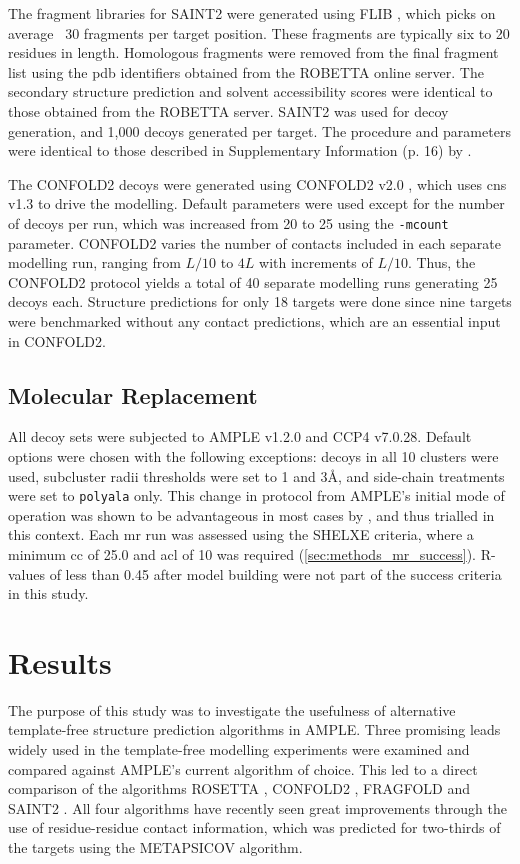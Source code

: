 The fragment libraries for SAINT2 were generated using FLIB \cite{De_Oliveira2015-kb}, which picks on average ~30 fragments per target position. These fragments are typically six to 20 residues in length. Homologous fragments were removed from the final fragment list using the \gls{pdb} identifiers obtained from the ROBETTA online server. The secondary structure prediction and solvent accessibility scores were identical to those obtained from the ROBETTA server. SAINT2 was used for decoy generation, and 1,000 decoys generated per target. The procedure and parameters were identical to those described in Supplementary Information (p. 16) by \textcite{De_Oliveira2018-sg}.

The CONFOLD2 decoys were generated using CONFOLD2 v2.0 \cite{Adhikari2018-lj}, which uses \gls{cns} v1.3 \cite{Brunger1998-sz} to drive the modelling. Default parameters were used except for the number of decoys per run, which was increased from 20 to 25 using the \texttt{-mcount} parameter. CONFOLD2 varies the number of contacts included in each separate modelling run, ranging from $L/10$ to $4L$ with increments of $L/10$. Thus, the CONFOLD2 protocol yields a total of 40 separate modelling runs generating 25 decoys each. Structure predictions for only 18 targets were done since nine targets were benchmarked without any contact predictions, which are an essential input in CONFOLD2.

\subsection{Molecular Replacement}
All decoy sets were subjected to AMPLE v1.2.0 and CCP4 v7.0.28. Default options were chosen with the following exceptions: decoys in all 10 clusters were used, subcluster radii thresholds were set to 1 and 3\AA, and side-chain treatments were set to \texttt{polyala} only. This change in protocol from AMPLE's initial mode of operation \cite{Bibby2012-lm} was shown to be advantageous in most cases by \textcite{Thomas2017-qu}, and thus trialled in this context.  Each \gls{mr} run was assessed using the SHELXE criteria, where a minimum \gls{cc} of 25.0 and \gls{acl} of 10 was required (\cref{sec:methods_mr_success}). R-values of less than 0.45 after model building were not part of the success criteria in this study.

\section{Results}
The purpose of this study was to investigate the usefulness of alternative template-free structure prediction algorithms in AMPLE. Three promising leads widely used in the template-free modelling experiments were examined and compared against AMPLE's current algorithm of choice. This led to a direct comparison of the algorithms ROSETTA \cite{Rohl2004-dj}, CONFOLD2 \cite{Adhikari2018-lj}, FRAGFOLD \cite{Jones2001-mc} and SAINT2 \cite{De_Oliveira2018-sg}. All four algorithms have recently seen great improvements through the use of residue-residue contact information, which was predicted for two-thirds of the targets using the METAPSICOV \cite{Jones2015-vq} algorithm.

